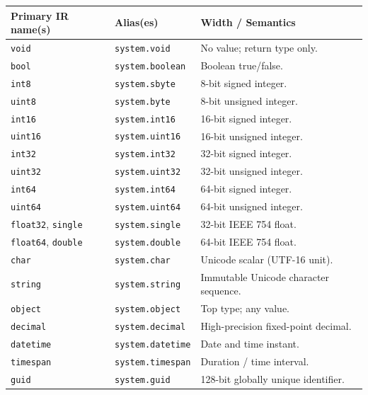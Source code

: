 \documentclass[11pt,a4paper]{article}
\begin{document}
\begin{longtable}{lll}
  \toprule
  \textbf{Primary IR name(s)} & \textbf{Alias(es)} & \textbf{Width / Semantics} \\
  \midrule
  \endhead
  \texttt{void}                     & \texttt{system.void}     & No value; return type only. \\
  \texttt{bool}                     & \texttt{system.boolean}  & Boolean true/false. \\
  \texttt{int8}                     & \texttt{system.sbyte}    & 8-bit signed integer. \\
  \texttt{uint8}                    & \texttt{system.byte}     & 8-bit unsigned integer. \\
  \texttt{int16}                    & \texttt{system.int16}    & 16-bit signed integer. \\
  \texttt{uint16}                   & \texttt{system.uint16}   & 16-bit unsigned integer. \\
  \texttt{int32}                    & \texttt{system.int32}    & 32-bit signed integer. \\
  \texttt{uint32}                   & \texttt{system.uint32}   & 32-bit unsigned integer. \\
  \texttt{int64}                    & \texttt{system.int64}    & 64-bit signed integer. \\
  \texttt{uint64}                   & \texttt{system.uint64}   & 64-bit unsigned integer. \\
  \texttt{float32}, \texttt{single} & \texttt{system.single}   & 32-bit IEEE 754 float. \\
  \texttt{float64}, \texttt{double} & \texttt{system.double}   & 64-bit IEEE 754 float. \\
  \texttt{char}                     & \texttt{system.char}     & Unicode scalar (UTF-16 unit). \\
  \texttt{string}                   & \texttt{system.string}   & Immutable Unicode character sequence. \\
  \texttt{object}                   & \texttt{system.object}   & Top type; any value. \\
  \texttt{decimal}                  & \texttt{system.decimal}  & High-precision fixed-point decimal. \\
  \texttt{datetime}                 & \texttt{system.datetime} & Date and time instant. \\
  \texttt{timespan}                 & \texttt{system.timespan} & Duration / time interval. \\
  \texttt{guid}                     & \texttt{system.guid}     & 128-bit globally unique identifier. \\
  \bottomrule
\end{longtable}
\end{document}
